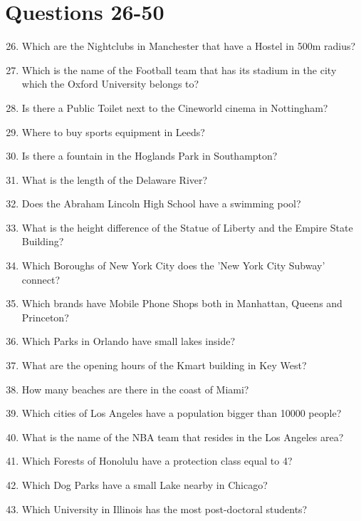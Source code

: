 \documentclass[12pt]{report}
\begin{document}
\section*{Questions 26-50}
\begin{enumerate}
    \setcounter{enumi}{25}
    \bigskip
    \item Which are the Nightclubs in Manchester that have a Hostel in 500m radius?
    \item Which is the name of the Football team that has its stadium in the city
        which the Oxford University belongs to?
    \item Is there a Public Toilet next to the Cineworld cinema in Nottingham?
    \item Where to buy sports equipment in Leeds?
    \item Is there a fountain in the Hoglands Park in Southampton?
    \item What is the length of the Delaware River?
    \item Does the Abraham Lincoln High School have a swimming pool?
    \item What is the height difference of the Statue of Liberty and the Empire
        State Building?
    \item Which Boroughs of New York City does the 'New York City Subway' connect?
    \item Which brands have Mobile Phone Shops both in Manhattan, Queens and Princeton?
    \item Which Parks in Orlando have small lakes inside?
    \item What are the opening hours of the Kmart building in Key West?
    \item How many beaches are there in the coast of Miami?
    \item Which cities of Los Angeles have a population bigger than 10000 people?
    \item What is the name of the NBA team that resides in the Los Angeles area?
    \item Which Forests of Honolulu have a protection class equal to 4?
    \item Which Dog Parks have a small Lake nearby in Chicago?
    \item Which University in Illinois has the most post-doctoral students?

\end{enumerate}
\end{document}
